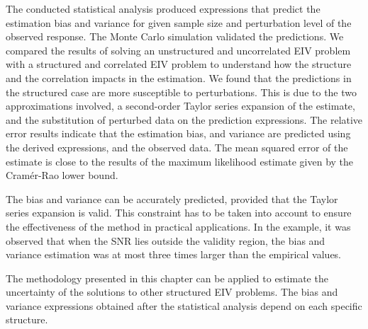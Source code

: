 The conducted statistical analysis produced expressions that predict the estimation bias and variance for given sample size and perturbation level of the observed response.
The Monte Carlo simulation validated the predictions.
We compared the results of solving an unstructured and uncorrelated EIV problem with a structured and correlated EIV problem to understand how the structure and the correlation impacts in the estimation.
We found that the predictions in the structured case are more susceptible to perturbations.
This is due to the two approximations involved, a second-order Taylor series expansion of the estimate, and the substitution of perturbed data on the prediction expressions.
The relative error results indicate that the estimation bias, and variance are predicted using the derived expressions, and the observed data.
The mean squared error of the estimate is close to the results of the maximum likelihood estimate given by the Cram\'er-Rao lower bound.

The bias and variance can be accurately predicted, provided that the Taylor series expansion is valid.
This constraint has to be taken into account to ensure the effectiveness of the method in practical applications.
In the example, it was observed that when the SNR lies outside the validity region, the bias and variance estimation was at most three times larger than the empirical values.

The methodology presented in this chapter can be applied to estimate the uncertainty of the solutions to other structured EIV problems.
The bias and variance expressions obtained after the statistical analysis depend on each specific structure.


